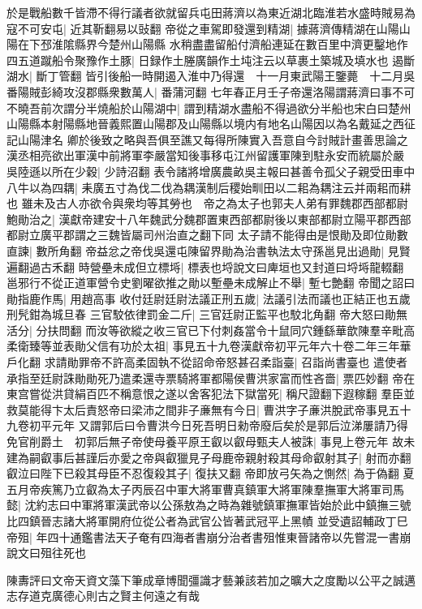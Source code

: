 於是戰船數千皆滯不得行議者欲就留兵屯田蔣濟以為東近湖北臨淮若水盛時賊易為寇不可安屯|{
	近其靳翻易以䜴翻}
帝從之車駕即發還到精湖|{
	據蔣濟傳精湖在山陽山陽在下邳淮隂縣界今楚州山陽縣}
水稍盡盡留船付濟船連延在數百里中濟更鑿地作四五道蹴船令聚豫作土豚|{
	日録作土塍廣韻作土坉注云以草裹土築城及填水也}
遏斷湖水|{
	斷丁管翻}
皆引後船一時開遏入淮中乃得還　十一月東武陽王鑒薨　十二月吳番陽賊彭綺攻沒郡縣衆數萬人|{
	番蒲河翻}
七年春正月壬子帝還洛陽謂蔣濟曰事不可不曉吾前次謂分半燒船於山陽湖中|{
	謂到精湖水盡船不得過欲分半船也宋白曰楚州山陽縣本射陽縣地晉義熙置山陽郡及山陽縣以境内有地名山陽因以為名戴延之西征記山陽津名}
卿於後致之略與吾俱至譙又每得所陳實入吾意自今討賊計畫善思論之　漢丞相亮欲出軍漢中前將軍李嚴當知後事移屯江州留護軍陳到駐永安而統屬於嚴　吳陸遜以所在少穀|{
	少詩沼翻}
表令諸將增廣農畝吳主報曰甚善令孤父子親受田車中八牛以為四耦|{
	耒廣五寸為伐二伐為耦漢制后稷始甽田以二耜為耦注云并兩耜而耕也}
雖未及古人亦欲令與衆均等其勞也　帝之為太子也郭夫人弟有罪魏郡西部都尉鮑勛治之|{
	漢獻帝建安十八年魏武分魏郡置東西部都尉後以東部都尉立陽平郡西部都尉立廣平郡謂之三魏皆屬司州治直之翻下同}
太子請不能得由是恨勛及即位勛數直諫|{
	數所角翻}
帝益忿之帝伐吳還屯陳留界勛為治書執法太守孫邕見出過勛|{
	見賢遍翻過古禾翻}
時營壘未成但立標埓|{
	標表也埒說文曰庳垣也又封道曰埒埓龍輟翻}
邕邪行不從正道軍營令史劉曜欲推之勛以塹壘未成解止不舉|{
	塹七艶翻}
帝聞之詔曰勛指鹿作馬|{
	用趙高事}
收付廷尉廷尉法議正刑五歲|{
	法議引法而議也正結正也五歲刑髠鉗為城旦春}
三官駮依律罰金二斤|{
	三官廷尉正監平也駮北角翻}
帝大怒曰勛無活分|{
	分扶問翻}
而汝等欲縱之收三官已下付刺姦當令十鼠同穴鍾繇華歆陳羣辛毗高柔衛臻等並表勛父信有功於太祖|{
	事見五十九卷漢獻帝初平元年六十卷二年三年華戶化翻}
求請勛罪帝不許高柔固執不從詔命帝怒甚召柔詣臺|{
	召詣尚書臺也}
遣使者承指至廷尉誅勛勛死乃遣柔還寺票騎將軍都陽侯曹洪家富而性吝嗇|{
	票匹妙翻}
帝在東宫嘗從洪貸絹百匹不稱意恨之遂以舍客犯法下獄當死|{
	稱尺證翻下遐稼翻}
羣臣並救莫能得卞太后責怒帝曰梁沛之間非子亷無有今日|{
	曹洪字子亷洪脫武帝事見五十九卷初平元年}
又謂郭后曰令曹洪今日死吾明日勑帝廢后矣於是郭后泣涕屢請乃得免官削爵土　初郭后無子帝使母養平原王叡以叡母甄夫人被誅|{
	事見上卷元年}
故未建為嗣叡事后甚謹后亦愛之帝與叡獵見子母鹿帝親射殺其母命叡射其子|{
	射而亦翻}
叡泣曰陛下已殺其母臣不忍復殺其子|{
	復扶又翻}
帝即放弓矢為之惻然|{
	為于偽翻}
夏五月帝疾篤乃立叡為太子丙辰召中軍大將軍曹真鎮軍大將軍陳羣撫軍大將軍司馬懿|{
	沈約志曰中軍將軍漢武帝以公孫敖為之時為雜號鎮軍撫軍皆始於此中鎮撫三號比四鎮晉志諸大將軍開府位從公者為武官公皆著武冠平上黑幘}
並受遺詔輔政丁巳帝殂|{
	年四十通鑑書法天子奄有四海者書崩分治者書殂惟東晉諸帝以先嘗混一書崩說文曰殂往死也}


陳夀評曰文帝天資文藻下筆成章博聞彊識才藝兼該若加之曠大之度勵以公平之誠邁志存道克廣德心則古之賢主何遠之有哉

